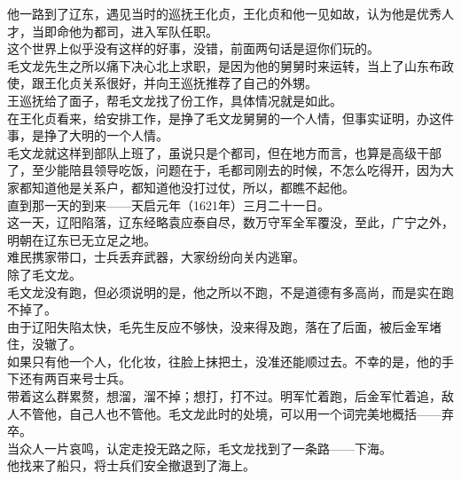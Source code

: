 \begin{multicols}{\theparacolNo}
他一路到了辽东，遇见当时的巡抚王化贞，王化贞和他一见如故，认为他是优秀人才，当即命他为都司，进入军队任职。\\

这个世界上似乎没有这样的好事，没错，前面两句话是逗你们玩的。\\

毛文龙先生之所以痛下决心北上求职，是因为他的舅舅时来运转，当上了山东布政使，跟王化贞关系很好，并向王巡抚推荐了自己的外甥。\\

王巡抚给了面子，帮毛文龙找了份工作，具体情况就是如此。\\

在王化贞看来，给安排工作，是挣了毛文龙舅舅的一个人情，但事实证明，办这件事，是挣了大明的一个人情。\\

毛文龙就这样到部队上班了，虽说只是个都司，但在地方而言，也算是高级干部了，至少能陪县领导吃饭，问题在于，毛都司刚去的时候，不怎么吃得开，因为大家都知道他是关系户，都知道他没打过仗，所以，都瞧不起他。\\

直到那一天的到来——天启元年（1621年）三月二十一日。\\

这一天，辽阳陷落，辽东经略袁应泰自尽，数万守军全军覆没，至此，广宁之外，明朝在辽东已无立足之地。\\

难民携家带口，士兵丢弃武器，大家纷纷向关内逃窜。\\

除了毛文龙。\\

毛文龙没有跑，但必须说明的是，他之所以不跑，不是道德有多高尚，而是实在跑不掉了。\\

由于辽阳失陷太快，毛先生反应不够快，没来得及跑，落在了后面，被后金军堵住，没辙了。\\

如果只有他一个人，化化妆，往脸上抹把土，没准还能顺过去。不幸的是，他的手下还有两百来号士兵。\\

带着这么群累赘，想溜，溜不掉；想打，打不过。明军忙着跑，后金军忙着追，敌人不管他，自己人也不管他。毛文龙此时的处境，可以用一个词完美地概括——弃卒。\\

当众人一片哀鸣，认定走投无路之际，毛文龙找到了一条路——下海。\\

他找来了船只，将士兵们安全撤退到了海上。\\


\end{multicols}
